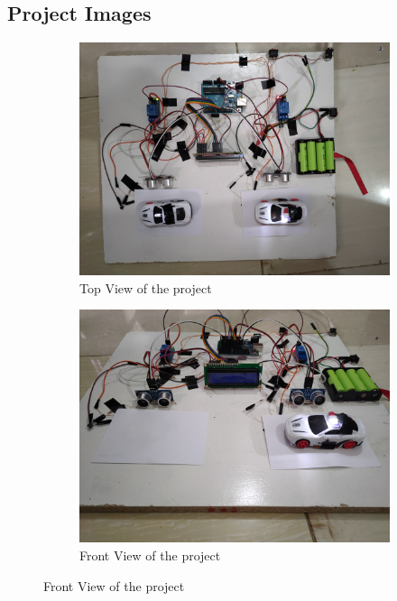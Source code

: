 \newpage
\begin{center}
    \section{Project Images}
\end{center}
\vspace{1\baselineskip}
	\begin{figure}[H]
	\centering
	\begin{subfigure}[b]{0.46\textwidth}
	\centering
	\includegraphics[width=\textwidth]{./figures/project_img1.jpg}
    \caption{Top View of the project}

	\end{subfigure}
	\hfill
	\begin{subfigure}[b]{0.46\textwidth}
	\centering
	\includegraphics[width=\textwidth]
{./figures/project_img2.jpg}
\caption{Front View of the project}

	\end{subfigure}
	\end{figure}

\vspace{1\baselineskip}








\newpage
